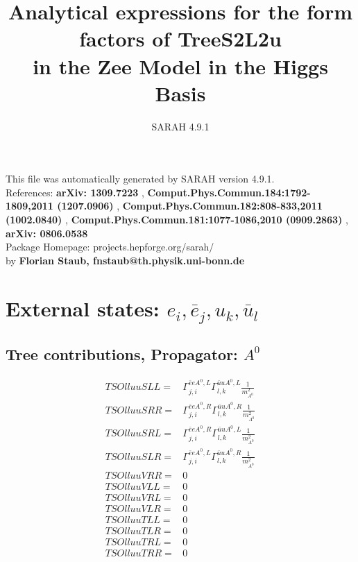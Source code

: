 \documentclass[A4,landscape]{article}
\begin{document}
\title{Analytical expressions for the form factors of TreeS2L2u\\ in the Zee Model in the Higgs Basis } 
 \author{SARAH 4.9.1} 
 \maketitle 
 \vspace{10cm} 
This file was automatically generated by SARAH version 4.9.1.  \\ 
References: {\bf arXiv: 1309.7223 }, {\bf Comput.Phys.Commun.184:1792-1809,2011 (1207.0906) }, {\bf Comput.Phys.Commun.182:808-833,2011 (1002.0840) }, {\bf Comput.Phys.Commun.181:1077-1086,2010 (0909.2863) }, {\bf arXiv: 0806.0538 } \\ 
Package Homepage: projects.hepforge.org/sarah/ \\ 
by {\bf Florian Staub, fnstaub@th.physik.uni-bonn.de} 
 \pagebreak 
 \tableofcontents 
 \pagebreak 
\section{External states: ${e_{{i}}, \bar{e}_{{j}}, u_{{k}}, \bar{u}_{{l}}}$} 
\subsection{Tree contributions, Propagator: $A^0$} 

\begin{align} 
  TSOlluuSLL= & \Gamma^{\bar{e}e A^0 ,L}_{j, i} \Gamma^{\bar{u}u A^0 ,L}_{l, k} \frac{1}{m^2_{A^0}} \\ 
  TSOlluuSRR= & \Gamma^{\bar{e}e A^0 ,R}_{j, i} \Gamma^{\bar{u}u A^0 ,R}_{l, k} \frac{1}{m^2_{A^0}} \\ 
  TSOlluuSRL= & \Gamma^{\bar{e}e A^0 ,R}_{j, i} \Gamma^{\bar{u}u A^0 ,L}_{l, k} \frac{1}{m^2_{A^0}} \\ 
  TSOlluuSLR= & \Gamma^{\bar{e}e A^0 ,L}_{j, i} \Gamma^{\bar{u}u A^0 ,R}_{l, k} \frac{1}{m^2_{A^0}} \\ 
  TSOlluuVRR= & 0 \\ 
  TSOlluuVLL= & 0 \\ 
  TSOlluuVRL= & 0 \\ 
  TSOlluuVLR= & 0 \\ 
  TSOlluuTLL= & 0 \\ 
  TSOlluuTLR= & 0 \\ 
  TSOlluuTRL= & 0 \\ 
  TSOlluuTRR= & 0 \\ 
\end{align} 
\end{document}
